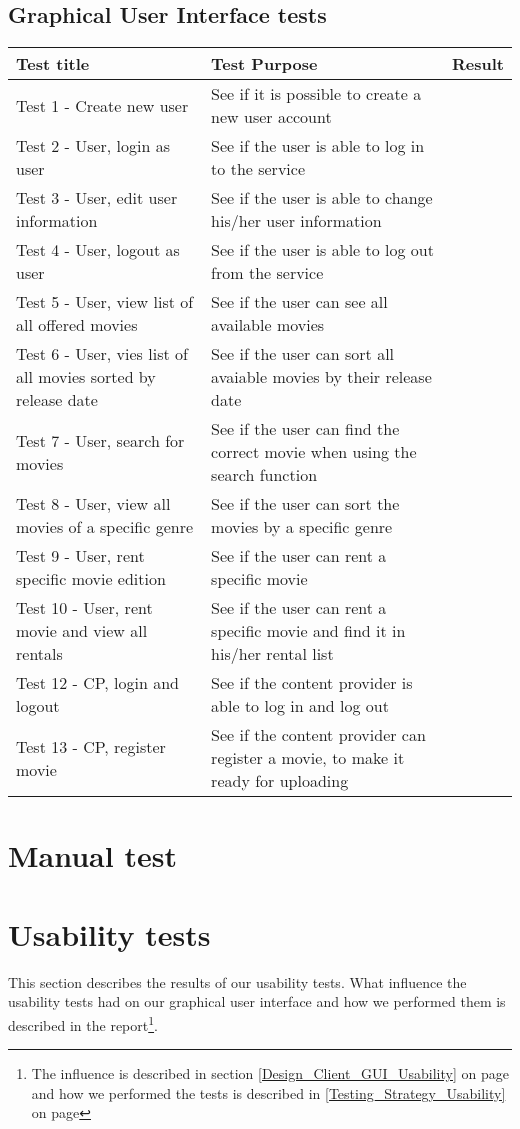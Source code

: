 \subsection{Graphical User Interface tests}
\label{Appendix_Test_Table_GUI}
\begin{centering}
\begin{longtable}{| p{5 cm} | p{7 cm} | c |}
\hline
Test title & Test Purpose & Result\\
\hline
Test 1 - Create new user & See if it is possible to create a new user account & \\
\hline
Test 2 - User, login as user & See if the user is able to log in to the service & \\
\hline
Test 3 - User, edit user information & See if the user is able to change his/her user information & \\
\hline
Test 4 - User, logout as user & See if the user is able to log out from the service & \\
\hline
Test 5 - User, view list of all offered movies & See if the user can see all available movies & \\
\hline
Test 6 - User, vies list of all movies sorted by release date & See if the user can sort all avaiable movies by their release date & \\
\hline
Test 7 - User, search for movies & See if the user can find the correct movie when using the search function & \\
\hline
Test 8 - User, view all movies of a specific genre & See if the user can sort the movies by a specific genre & \\
\hline
Test 9 - User, rent specific movie edition & See if the user can rent a specific movie & \\
\hline
Test 10 - User, rent movie and view all rentals & See if the user can rent a specific movie and find it in his/her rental list & \\
\hline
Test 12 - CP, login and logout & See if the content provider is able to log in and log out & \\
\hline
Test 13 - CP, register movie & See if the content provider can register a movie, to make it ready for uploading & \\
\hline
\end{longtable}
\end{centering}
\section{Manual test}

\label{Appendix_Test_Manual}

\section{Usability tests}
\label{Appendix_Test_Usability}
This section describes the results of our usability tests. What influence the usability tests had on our graphical user interface and how we performed them is described in the report\footnote{The influence is described in section \ref {Design_Client_GUI_Usability} on page \pageref{Design_Client_GUI_Usability} and how we performed the tests is described in \ref{Testing_Strategy_Usability} on page \pageref{Testing_Strategy_Usability}}.